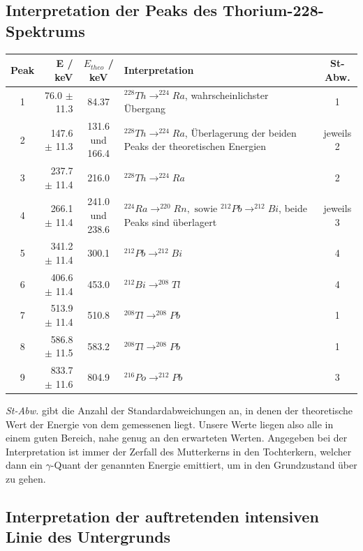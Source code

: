 \subsection{Interpretation der Peaks des Thorium-228-Spektrums}

\begin{center}
\begin{tabular}{| c | r | c | p{6cm} | c |} \hline
Peak & E / keV & $E_{theo}$ / keV & Interpretation &St-Abw. \\ \hline
1 & 76.0 $\pm$ 11.3  & 84.37 & $^{228}Th \rightarrow ^{224}Ra$, wahrscheinlichster Übergang & 1 \\
2 & 147.6 $\pm$ 11.3 & 131.6 und 166.4 & $^{228}Th \rightarrow ^{224}Ra$, Überlagerung der beiden Peaks der theoretischen Energien & jeweils 2\\
3 & 237.7 $\pm$ 11.4 & 216.0 & $^{228}Th \rightarrow ^{224}Ra$ & 2\\
4 & 266.1 $\pm$ 11.4 & 241.0 und 238.6 & $^{224}Ra \rightarrow ^{220}Rn, \text{\ \ sowie \ \ } ^{212}Pb \rightarrow ^{212}Bi$, beide Peaks sind überlagert & jeweils 3\\
5 & 341.2 $\pm$ 11.4 & 300.1 & $^{212}Pb \rightarrow ^{212}Bi$ & 4\\
6 & 406.6 $\pm$ 11.4 & 453.0 & $^{212}Bi \rightarrow ^{208}Tl$ & 4\\
7 & 513.9 $\pm$ 11.4 & 510.8 & $^{208}Tl \rightarrow ^{208}Pb$ & 1\\
8 & 586.8 $\pm$ 11.5 & 583.2 & $^{208}Tl \rightarrow ^{208}Pb$ & 1\\
9 & 833.7 $\pm$ 11.6 & 804.9 & $^{216}Po \rightarrow ^{212}Pb$ & 3\\ \hline
\end{tabular}
\end{center}

\emph{St-Abw.} gibt die Anzahl der Standardabweichungen an, in denen der theoretische Wert der Energie von dem gemessenen liegt. Unsere Werte liegen also alle in einem guten Bereich, nahe genug an den erwarteten Werten. Angegeben bei der Interpretation ist immer der Zerfall des Mutterkerns in den Tochterkern, welcher dann ein $\gamma$-Quant der genannten Energie emittiert, um in den Grundzustand über zu gehen.


\subsection{Interpretation der auftretenden intensiven Linie des Untergrunds}

